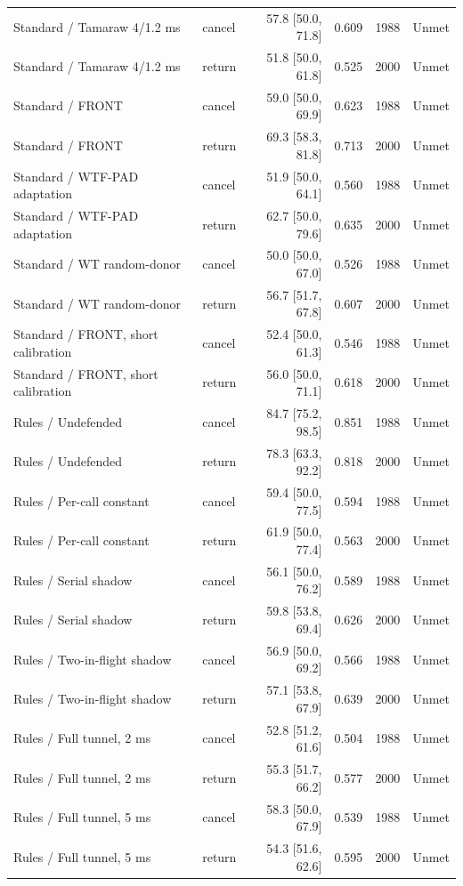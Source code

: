 \begin{longtable}{@{}llrrrr@{}}
Standard / Tamaraw 4/1.2 ms & cancel & 57.8 [50.0, 71.8] & 0.609 & 1988 & Unmet\\
Standard / Tamaraw 4/1.2 ms & return & 51.8 [50.0, 61.8] & 0.525 & 2000 & Unmet\\
Standard / FRONT & cancel & 59.0 [50.0, 69.9] & 0.623 & 1988 & Unmet\\
Standard / FRONT & return & 69.3 [58.3, 81.8] & 0.713 & 2000 & Unmet\\
Standard / WTF-PAD adaptation & cancel & 51.9 [50.0, 64.1] & 0.560 & 1988 & Unmet\\
Standard / WTF-PAD adaptation & return & 62.7 [50.0, 79.6] & 0.635 & 2000 & Unmet\\
Standard / WT random-donor & cancel & 50.0 [50.0, 67.0] & 0.526 & 1988 & Unmet\\
Standard / WT random-donor & return & 56.7 [51.7, 67.8] & 0.607 & 2000 & Unmet\\
Standard / FRONT, short calibration & cancel & 52.4 [50.0, 61.3] & 0.546 & 1988 & Unmet\\
Standard / FRONT, short calibration & return & 56.0 [50.0, 71.1] & 0.618 & 2000 & Unmet\\
Rules / Undefended & cancel & 84.7 [75.2, 98.5] & 0.851 & 1988 & Unmet\\
Rules / Undefended & return & 78.3 [63.3, 92.2] & 0.818 & 2000 & Unmet\\
Rules / Per-call constant & cancel & 59.4 [50.0, 77.5] & 0.594 & 1988 & Unmet\\
Rules / Per-call constant & return & 61.9 [50.0, 77.4] & 0.563 & 2000 & Unmet\\
Rules / Serial shadow & cancel & 56.1 [50.0, 76.2] & 0.589 & 1988 & Unmet\\
Rules / Serial shadow & return & 59.8 [53.8, 69.4] & 0.626 & 2000 & Unmet\\
Rules / Two-in-flight shadow & cancel & 56.9 [50.0, 69.2] & 0.566 & 1988 & Unmet\\
Rules / Two-in-flight shadow & return & 57.1 [53.8, 67.9] & 0.639 & 2000 & Unmet\\
Rules / Full tunnel, 2 ms & cancel & 52.8 [51.2, 61.6] & 0.504 & 1988 & Unmet\\
Rules / Full tunnel, 2 ms & return & 55.3 [51.7, 66.2] & 0.577 & 2000 & Unmet\\
Rules / Full tunnel, 5 ms & cancel & 58.3 [50.0, 67.9] & 0.539 & 1988 & Unmet\\
Rules / Full tunnel, 5 ms & return & 54.3 [51.6, 62.6] & 0.595 & 2000 & Unmet\\

\end{longtable}
